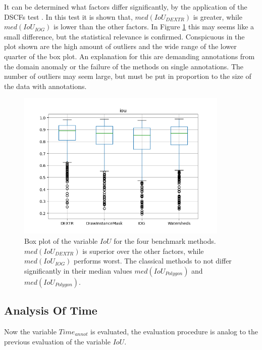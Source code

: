 It can be determined what factors differ significantly, by the application of the DSCFs  test \cite{CF91-dscf}.
In this test it is shown that, $ med \left( IoU_{DEXTR} \right) $ is greater, while $ med \left( IoU_{IOG} \right) $ is lower than the other factors. 
In Figure \ref{fig:ch5:sec1:iou_box_plot} this may seems like a small difference, but the statistical relevance is confirmed.
Conspicuous in the plot shown are the high amount of outliers and the wide range of the lower quarter of the box plot.
An explanation for this are demanding annotations from the domain anomaly or the failure of the methods on single annotations.
The number of outliers may seem large, but must be put in proportion to the size of the data with \getNumberBenchmarkAnnotations \space annotations.

\begin{figure}
	\centering
	\includegraphics[width=0.9\textwidth]{figures/chap51_boxplot_iou.png}
	\caption[Box plot IoU per method]{
		Box plot of the variable $ IoU $ for the four benchmark methods.
		$ med \left( IoU_{DEXTR} \right) $ is superior over the other factors, while $ med \left( IoU_{IOG} \right) $ performs worst.
		The classical methods to not differ significantly in their median values $ med \left( IoU_{Polygon} \right) $ and $ med \left( IoU_{Polygon} \right) $.
	} \label{fig:ch5:sec1:iou_box_plot}
\end{figure}



\subsection{Analysis Of Time}\label{ord:ch5:sec1:subsec3}
Now the variable $Time_{annot}$ is evaluated, the evaluation procedure is analog to the previous evaluation of the variable $IoU$.
